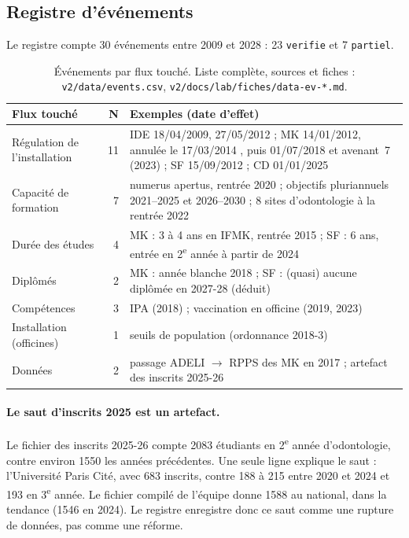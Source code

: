 \subsection{Registre d'événements}\label{a4-sec:res-evenements}
Le registre compte 30 événements entre 2009 et 2028\mesure{} : 23 \texttt{verifie} et 7 \texttt{partiel}.
\begin{table}[h]
\centering\small
\begin{tabular}{@{}lrp{10.5cm}@{}}
\toprule
Flux touché & N & Exemples (date d'effet) \\
\midrule
Régulation de l'installation & 11 & IDE 18/04/2009, 27/05/2012 \citep{a4-ameliIde} ; MK 14/01/2012, annulée le 17/03/2014 \citep{a4-ce2014mk}, puis 01/07/2018 et avenant~7 (2023) \citep{a4-ameliMk} ; SF 15/09/2012 \citep{a4-ameliSf} ; CD 01/01/2025 \citep{a4-arspaca2025cd} \\
Capacité de formation & 7 & numerus apertus, rentrée 2020 \citep{a4-loiotss2019} ; objectifs pluriannuels 2021--2025 et 2026--2030 ; 8 sites d'odontologie à la rentrée 2022 \\
Durée des études & 4 & MK : 3 à 4 ans en IFMK, rentrée 2015 \citep{a4-arretemk2015} ; SF : 6 ans, entrée en 2\textsuperscript{e} année à partir de 2024 \\
Diplômés & 2 & MK : année blanche 2018 \citep{a4-drees2020er1159} ; SF : (quasi) aucune diplômée en 2027-28 (déduit) \\
Compétences & 3 & IPA (2018) ; vaccination en officine (2019, 2023) \\
Installation (officines) & 1 & seuils de population (ordonnance 2018-3) \\
Données & 2 & passage ADELI $\rightarrow$ RPPS des MK en 2017 \citep{a4-drees2020er1159} ; artefact des inscrits 2025-26 \\
\bottomrule
\end{tabular}
\caption{Événements par flux touché. Liste complète, sources et fiches : \texttt{v2/data/events.csv},
\texttt{v2/docs/lab/fiches/data-ev-*.md}.}
\label{a4-tab:evenements}
\end{table}

\paragraph{Le saut d'inscrits 2025 est un artefact.} Le fichier des inscrits 2025-26 compte \num{2083} étudiants
en 2\textsuperscript{e} année d'odontologie\mesure{}, contre environ \num{1550} les années précédentes. Une seule
ligne explique le saut : l'Université Paris Cité, avec 683 inscrits\mesure{}, contre 188 à 215 entre 2020 et 2024
et 193 en 3\textsuperscript{e} année. Le fichier compilé de l'équipe donne \num{1588} au national, dans la tendance
(\num{1546} en 2024). Le registre enregistre donc ce saut comme une rupture de données, pas comme une réforme.

